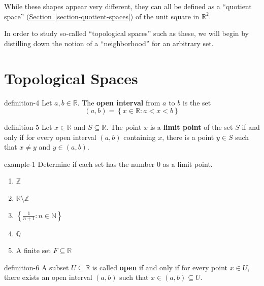 \documentclass[10pt,]{article}
\newcommand{\terminology}[1]{\textbf{#1}}
\newcommand{\mb}{\mathbb}
\newcommand{\setBuilder}[2]{\left\{#1:#2\right\}}
\newcommand{\lt}{<}
\begin{document}
\hypertarget{p-17}{}%
While these shapes appear very different, they can all be defined as a ``quotient space'' (\hyperref[section-quotient-spaces]{Section~\ref{section-quotient-spaces}}) of the unit square in \(\mathbb R^2\).%
\par
\hypertarget{p-18}{}%
In order to study so-called ``topological spaces'' such as these, we will begin by distilling down the notion of a ``neighborhood'' for an arbitrary set.%
%
%
\typeout{************************************************}
\typeout{************************************************}
%
\section[{Topological Spaces}]{Topological Spaces}\label{section-topological-spaces}
\begin{definition}{}{definition-4}%
\hypertarget{p-19}{}%
Let \(a,b\in\mb R\). The \terminology{open interval} from \(a\) to \(b\) is the set%
%
\begin{equation*}
(a,b)=\setBuilder{x\in\mb R}{a\lt x\lt b}
\end{equation*}
\end{definition}
\begin{definition}{}{definition-5}%
\hypertarget{p-20}{}%
Let \(x\in\mb R\) and \(S\subseteq\mb R\). The point \(x\) is a \terminology{limit point} of the set \(S\) if and only if for every open interval \((a,b)\) containing \(x\), there is a point \(y\in S\) such that \(x\not=y\) and \(y\in(a,b)\).%
\end{definition}
\begin{example}{}{example-1}%
\hypertarget{p-21}{}%
Determine if each set has the number \(0\) as a limit point.%
\leavevmode%
\begin{enumerate}
\item\hypertarget{li-3}{}\(\mb Z\)%
\item\hypertarget{li-4}{}\(\mb R\setminus\mb Z\)%
\item\hypertarget{li-5}{}\(\setBuilder{\frac{1}{n+1}}{n\in\mb N}\)%
\item\hypertarget{li-6}{}\(\mb Q\)%
\item\hypertarget{li-7}{}A finite set \(F\subseteq\mb R\)%
\end{enumerate}
\end{example}
\begin{definition}{}{definition-6}%
\hypertarget{p-22}{}%
A subset \(U\subseteq\mb R\) is called \terminology{open} if and only if for every point \(x\in U\), there exists an open interval \((a,b)\) such that \(x\in(a,b)\subseteq U\).%
\end{definition}
\end{document}
